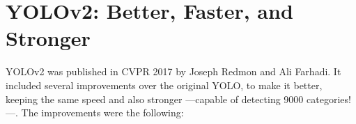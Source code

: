\documentclass{article}
\begin{document}


\section{YOLOv2: Better, Faster, and Stronger}


YOLOv2 was published in CVPR 2017 \cite{redmon2017yolo9000} by Joseph Redmon and Ali Farhadi. It included several improvements over the original YOLO, to make it better, keeping the same speed and also stronger —capable of detecting 9000 categories!—. The improvements were the following:
\end{document}
